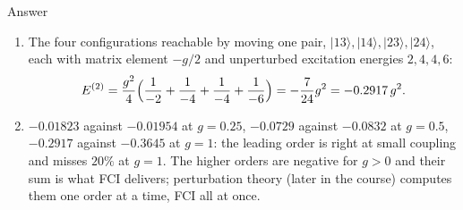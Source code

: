 \documentclass[aspectratio=169,10pt]{beamer}
\newcounter{thinkctr}
\newcommand{\thinka}[1]{%
  \begin{tcolorbox}[colback=paleteal,colframe=teal,title={\bfseries Answer to pause \#\thethinkctr}]
  #1
  \end{tcolorbox}}
\newcommand{\ket}[1]{\vert #1\rangle}
\begin{document}
\begin{frame}{Answer}
  \thinka{
  \begin{enumerate}
    \item The four configurations reachable by moving one pair, $\ket{13},\ket{14},\ket{23},\ket{24}$, each with matrix element $-g/2$ and unperturbed excitation energies $2,4,4,6$:
    \[
      E^{(2)}=\frac{g^2}{4}\Bigl(\frac{1}{-2}+\frac{1}{-4}+\frac{1}{-4}+\frac{1}{-6}\Bigr)=-\frac{7}{24}g^2=-0.2917\,g^2 .
    \]
    \item $-0.01823$ against $-0.01954$ at $g=0.25$, $-0.0729$ against $-0.0832$ at $g=0.5$, $-0.2917$ against $-0.3645$ at $g=1$: the leading order is right at small coupling and misses $20\%$ at $g=1$. The higher orders are negative for $g>0$ and their sum is what FCI delivers; perturbation theory (later in the course) computes them one order at a time, FCI all at once.
  \end{enumerate}}
\end{frame}
\end{document}
